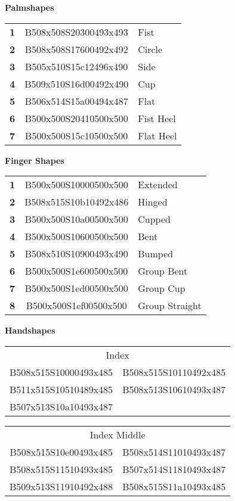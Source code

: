 \documentclass{article}
\begin{document}
\begin{multicols}{3}
\noindent
\textbf{Palmshapes}

\noindent
\begin{tabular}{r@{}c@{}l}
\textbf{1}&B508x508S20300493x493&Fist\\
\textbf{2}&B508x508S17600492x492&Circle\\
\textbf{3}&B505x510S15c12496x490&Side\\
\textbf{4}&B509x510S16d00492x490&Cup\\
\textbf{5}&B506x514S15a00494x487&Flat\\
\textbf{6}&B500x500S20410500x500&Fist Heel\\
\textbf{7}&B500x500S15c10500x500&Flat Heel\\
\end{tabular}

\noindent
\textbf{Finger Shapes}

\noindent
\begin{tabular}{r@{}c@{}l}
\textbf{1}&B500x500S10000500x500&Extended\\
\textbf{2}&B508x515S10b10492x486&Hinged\\
\textbf{3}&B500x500S10a00500x500&Cupped\\
\textbf{4}&B500x500S10600500x500&Bent\\
\textbf{5}&B508x510S10900493x490&Bumped\\
\textbf{6}&B500x500S1e600500x500&Group Bent\\
\textbf{7}&B500x500S1ed00500x500&Group Cup\\
\textbf{8}&B500x500S1ef00500x500&Group Straight\\
\end{tabular}

\noindent
\textbf{Handshapes}

\noindent
\begin{tabular}{cc}
\multicolumn{2}{c}{Index}\\
B508x515S10000493x485&B508x515S10110492x485\\
B511x515S10510489x485&B508x513S10610493x487\\
B507x513S10a10493x487\\
\end{tabular}

\noindent
\begin{tabular}{cc}
\multicolumn{2}{c}{Index Middle}\\
B508x515S10e00493x485&B508x514S11010493x487\\
B508x515S11510493x485&B507x514S11810493x487\\
B509x513S11910492x488&B508x515S11a10493x485\\
\end{tabular}


\end{multicols}
\end{document}
